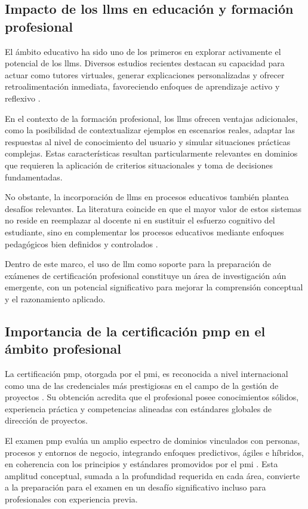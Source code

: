\subsection{Impacto de los \glspl{llm} en educación y formación profesional}

El ámbito educativo ha sido uno de los primeros en explorar activamente el potencial de los \glspl{llm}. Diversos estudios recientes destacan su capacidad para actuar como tutores virtuales, generar explicaciones personalizadas y ofrecer retroalimentación inmediata, favoreciendo enfoques de aprendizaje activo y reflexivo \parencite{kasneci2023chatgpt}.

En el contexto de la formación profesional, los \glspl{llm} ofrecen ventajas adicionales, como la posibilidad de contextualizar ejemplos en escenarios reales, adaptar las respuestas al nivel de conocimiento del usuario y simular situaciones prácticas complejas. Estas características resultan particularmente relevantes en dominios que requieren la aplicación de criterios situacionales y toma de decisiones fundamentadas.

No obstante, la incorporación de \glspl{llm} en procesos educativos también plantea desafíos relevantes. La literatura coincide en que el mayor valor de estos sistemas no reside en reemplazar al docente ni en sustituir el esfuerzo cognitivo del estudiante, sino en complementar los procesos educativos mediante enfoques pedagógicos bien definidos y controlados \parencite{kasneci2023chatgpt}.

Dentro de este marco, el uso de \gls{llm} como soporte para la preparación de exámenes de certificación profesional constituye un área de investigación aún emergente, con un potencial significativo para mejorar la comprensión conceptual y el razonamiento aplicado.

\subsection{Importancia de la certificación \gls{pmp} en el ámbito profesional}

La certificación \gls{pmp}, otorgada por el \gls{pmi}, es reconocida a nivel internacional como una de las credenciales más prestigiosas en el campo de la gestión de proyectos \parencite{pmi2021handbook}. Su obtención acredita que el profesional posee conocimientos sólidos, experiencia práctica y competencias alineadas con estándares globales de dirección de proyectos.

El examen \gls{pmp} evalúa un amplio espectro de dominios vinculados con personas, procesos y entornos de negocio, integrando enfoques predictivos, ágiles e híbridos, en coherencia con los principios y estándares promovidos por el \gls{pmi} \parencite{pmbok7}. Esta amplitud conceptual, sumada a la profundidad requerida en cada área, convierte a la preparación para el examen en un desafío significativo incluso para profesionales con experiencia previa.


